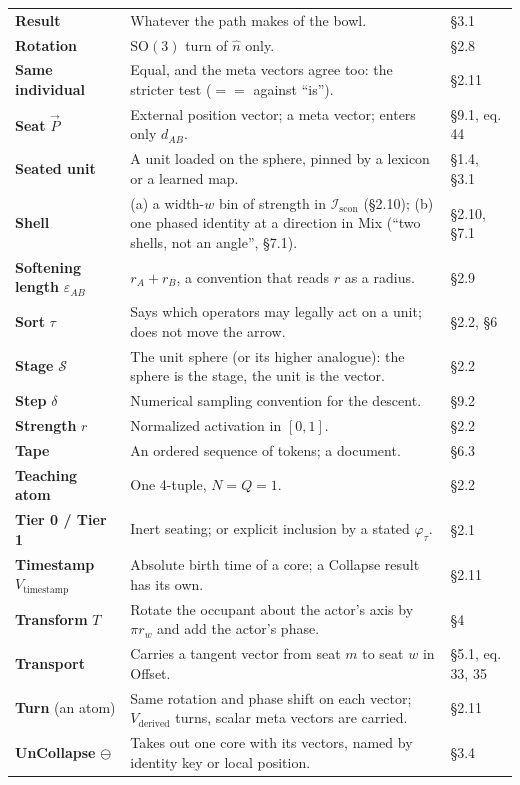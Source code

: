 \documentclass[10.5pt]{article}
\begin{document}
{\begin{longtable}{L{3.6cm}L{10.9cm}L{1.8cm}}
\textbf{Result} & Whatever the path makes of the bowl. & §3.1 \\
\textbf{Rotation} & $\mathrm{SO}(3)$ turn of $\hat n$ only. & §2.8 \\
\textbf{Same individual} & Equal, and the meta vectors agree too: the stricter test ($==$ against “is”). & §2.11 \\
\textbf{Seat} $\vec P$ & External position vector; a meta vector; enters only $d_{AB}$. & §9.1, eq. 44 \\
\textbf{Seated unit} & A unit loaded on the sphere, pinned by a lexicon or a learned map. & §1.4, §3.1 \\
\textbf{Shell} & (a) a width-$w$ bin of strength in $\mathcal{I}_{\mathrm{scon}}$ (§2.10); (b) one phased identity at a direction in Mix (“two shells, not an angle”, §7.1). & §2.10, §7.1 \\
\textbf{Softening length} $\varepsilon_{AB}$ & $r_A+r_B$, a convention that reads $r$ as a radius. & §2.9 \\
\textbf{Sort} $\tau$ & Says which operators may legally act on a unit; does not move the arrow. & §2.2, §6 \\
\textbf{Stage} $\mathcal S$ & The unit sphere (or its higher analogue): the sphere is the stage, the unit is the vector. & §2.2 \\
\textbf{Step} $\delta$ & Numerical sampling convention for the descent. & §9.2 \\
\textbf{Strength} $r$ & Normalized activation in $[0,1]$. & §2.2 \\
\textbf{Tape} & An ordered sequence of tokens; a document. & §6.3 \\
\textbf{Teaching atom} & One 4-tuple, $N=Q=1$. & §2.2 \\
\textbf{Tier 0 / Tier 1} & Inert seating; or explicit inclusion by a stated $\varphi_\tau$. & §2.1 \\
\textbf{Timestamp} $V_{\text{timestamp}}$ & Absolute birth time of a core; a Collapse result has its own. & §2.11 \\
\textbf{Transform} $T$ & Rotate the occupant about the actor's axis by $\pi r_w$ and add the actor's phase. & §4 \\
\textbf{Transport} & Carries a tangent vector from seat $m$ to seat $w$ in Offset. & §5.1, eq. 33, 35 \\
\textbf{Turn} (an atom) & Same rotation and phase shift on each vector; $V_{\text{derived}}$ turns, scalar meta vectors are carried. & §2.11 \\
\textbf{UnCollapse} $\ominus$ & Takes out one core with its vectors, named by identity key or local position. & §3.4 \\

\end{longtable}}
\end{document}
